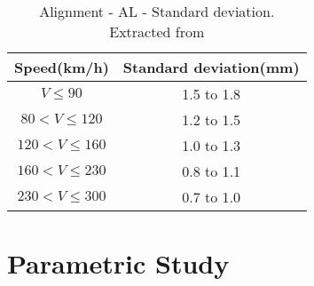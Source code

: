 \begin{table}[h]
    \centering
    \caption{Alignment - AL - Standard deviation. Extracted from \cite[Table B.6]{13848}}
    \begin{tabular}{cc}
        \hline
        Speed(km/h) & Standard deviation(mm) \\
        \hline
        $V\leq 90$ & 1.5 to 1.8 \\
        $80 < V \leq 120$ & 1.2 to 1.5 \\
        $120 < V \leq 160$ & 1.0 to 1.3 \\
        $160 <V \leq 230$ & 0.8 to 1.1 \\
        $230 <V \leq 300$ & 0.7 to 1.0 \\
        \hline
    \end{tabular}
    \label{tab:lateraldeviation}
\end{table}


\chapter{Parametric Study}





